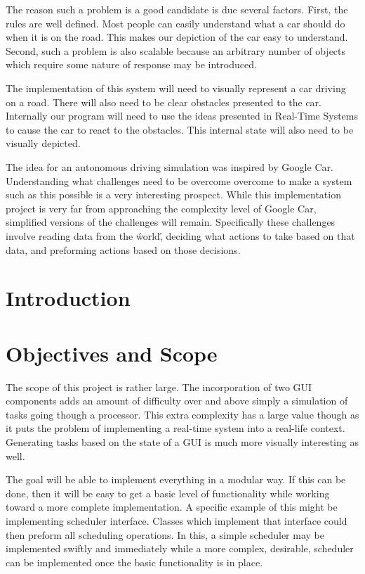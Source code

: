 \documentclass{article} %
\begin{document}
The reason such a problem is a good candidate is due several factors.
First, the rules are well defined. Most people can easily understand what a car should do when it is on the road. This makes our depiction of the car easy to understand.
Second, such a problem is also scalable because an arbitrary number of objects which require some nature of response may be introduced.

The implementation of this system will need to visually represent a car driving on a road.
There will also need to be clear obstacles presented to the car.
Internally our program will need to use the ideas presented in Real-Time Systems to cause the car to react to the obstacles.
This internal state will also need to be visually depicted.

The idea for an autonomous driving simulation was inspired by Google Car.
Understanding what challenges need to be overcome overcome to make a system such as this possible is a very interesting prospect.
While this implementation project is very far from approaching the complexity level of Google Car, simplified versions of the challenges will remain.
Specifically these challenges involve reading data from the \'world\', deciding what actions to take based on that data, and preforming actions based on those decisions.

\section{Introduction}

\section{Objectives and Scope}
The scope of this project is rather large.
The incorporation of two GUI components adds an amount of difficulty over and above simply a simulation of tasks going though a processor.
This extra complexity has a large value though as it puts the problem of implementing a real-time system into a real-life context.
Generating tasks based on the state of a GUI is much more visually interesting as well.

The goal will be able to implement everything in a modular way. If this can be done, then it will be easy to get a basic level of functionality while working toward a more complete implementation.
A specific example of this might be implementing scheduler interface. Classes which implement that interface could then preform all scheduling operations.
In this, a simple scheduler may be implemented swiftly and immediately while a more complex, desirable, scheduler can be implemented once the basic functionality is in place.
\end{document}
